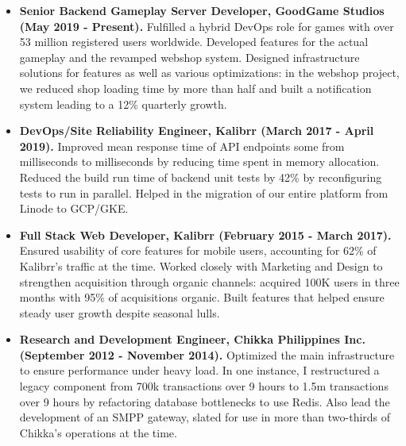\documentclass{article}
\begin{document}
    \begin{itemize}
      \item \textbf{Senior Backend Gameplay Server Developer, GoodGame Studios (May 2019 - Present).}
      Fulfilled a hybrid DevOps role for games with over 53 million registered
      users worldwide. Developed features for the actual gameplay and the
      revamped webshop system. Designed infrastructure solutions for features as
      well as various optimizations: in the webshop project, we reduced shop
      loading time by more than half and built a notification system leading to
      a 12\% quarterly growth.
      

      \item \textbf{DevOps/Site Reliability Engineer, Kalibrr (March 2017 - April 2019).}
      Improved mean response time of API endpoints some from 
      milliseconds to  milliseconds by reducing time spent in memory
      allocation. Reduced the build run time of backend unit tests by 42\% by
      reconfiguring tests to run in parallel. Helped in the migration of our 
      entire platform from Linode to GCP/GKE.
      

      \item \textbf{Full Stack Web Developer, Kalibrr (February 2015 - March 2017).}
      Ensured usability of core features for mobile users, accounting for 62\% of Kalibrr's traffic
      at the time. Worked closely with Marketing and Design to strengthen acquisition
      through organic channels: acquired \ctilde100K users in three months with 95\% of
      acquisitions organic. Built features that helped ensure steady user growth despite seasonal lulls.

      
      \item \textbf{Research and Development Engineer, Chikka Philippines Inc. (September 2012 - November 2014).}
      Optimized the main infrastructure to ensure performance under heavy load.
      In one instance, I restructured a legacy component from \ctilde700k
      transactions over 9 hours to \ctilde1.5m transactions over 9 hours by
      refactoring database bottlenecks to use Redis. Also lead the development
      of an SMPP gateway, slated for use in more than two-thirds of Chikka's
      operations at the time.


\end{itemize}
\end{document}
